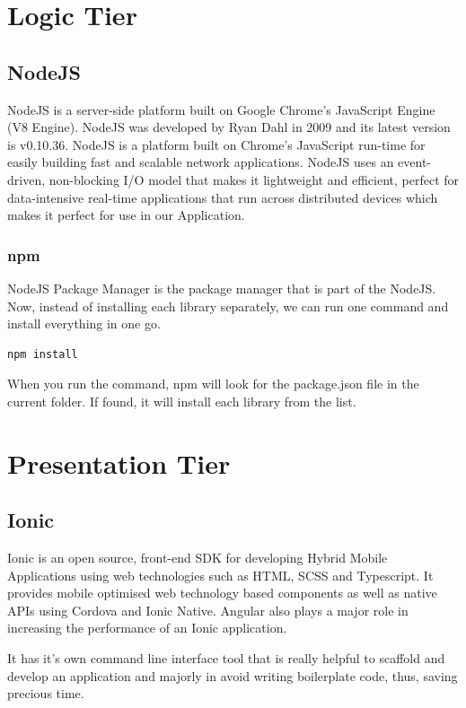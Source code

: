 \documentclass[12pt,a4paper,oneside,openany]{book}
\begin{document}
\section{Logic Tier}

\subsection{NodeJS}
NodeJS is a server-side platform built on Google Chrome's JavaScript Engine (V8 Engine). NodeJS was developed by Ryan Dahl in 2009 and its latest version is v0.10.36. NodeJS is a platform built on Chrome's JavaScript run-time for easily building fast and scalable network applications. NodeJS uses an event-driven, non-blocking I/O model that makes it lightweight and efficient, perfect for data-intensive real-time applications that run across distributed devices which makes it perfect for use in our Application. \cite{NodeJS}

\subsubsection{npm}
NodeJS Package Manager is the package manager that is part of the NodeJS.
Now, instead of installing each library separately, we can run one command and install everything in one go.

\begin{verbatim}
npm install
\end{verbatim}

When you run the command, npm will look for the package.json file in the current folder. If found, it will install each library from the list. \cite{npm}

\section{Presentation Tier}

\subsection{Ionic}
Ionic is an open source, front-end SDK for developing Hybrid Mobile Applications using web technologies such as HTML, SCSS and Typescript. It provides mobile optimised web technology based components as well as native APIs using Cordova and Ionic Native. Angular also plays a major role in increasing the performance of an Ionic application.

It has it’s own command line interface tool that is really helpful to scaffold and develop an application and majorly in avoid writing boilerplate code, thus, saving precious time. \cite{Ionic}
\end{document}
